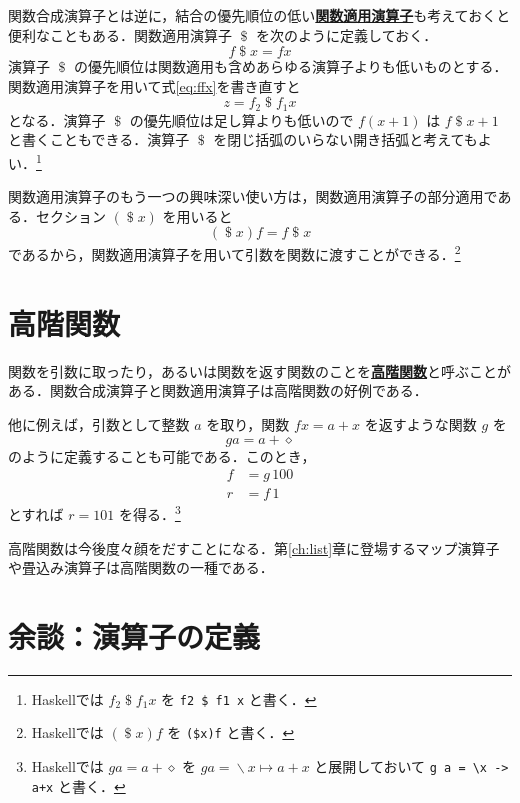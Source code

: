 \documentclass[a5paper,twoside,fleqn,draft]{jsbook}
\newcommand{\programminglanguage}[1]{\textsf{#1}}
\newcommand{\haskell}{\programminglanguage{Haskell}}
\newcommand{\keyword}[1]{{\underline{\textbf{#1}}}}
\newcommand{\code}[1]{\texttt{#1}}
\newcommand{\mAnonParam}{\diamond}
\DeclareMathOperator{\mApply}{\$}
\DeclareMathOperator{\mLambda}{\backslash}
\DeclareMathOperator{\mLambdaArrow}{\mapsto}
\newcommand{\mLambdaEXP}[2]{\mLambda{#1}\mLambdaArrow{#2}} %
\begin{document}
関数合成演算子とは逆に，結合の優先順位の低い\keyword{関数適用演算子}も考えておくと便利なこともある．関数適用演算子 $\mApply$ を次のように定義しておく．
\begin{equation}
  f\mApply x
  =fx
\end{equation}
演算子 $\mApply$ の優先順位は関数適用も含めあらゆる演算子よりも低いものとする．関数適用演算子を用いて式\eqref{eq:ffx}を書き直すと
\begin{equation}
  z
  =f_2\mApply f_1x
\end{equation}
となる．演算子 $\mApply$ の優先順位は足し算よりも低いので $f(x+1)$ は $f\mApply x+1$ と書くこともできる．演算子 $\mApply$ を閉じ括弧のいらない開き括弧と考えてもよい．\footnote{\haskell では $f_2\mApply f_1x$ を \code{f2 \$ f1 x} と書く．}

関数適用演算子のもう一つの興味深い使い方は，関数適用演算子の部分適用である．セクション $(\mApply x)$ を用いると
\begin{equation}
  (\mApply x)f
  =f\mApply x
\end{equation}
であるから，関数適用演算子を用いて引数を関数に渡すことができる．\footnote{\haskell では $(\mApply x)f$ を \code{(\$x)f} と書く．}

\section{高階関数}

関数を引数に取ったり，あるいは関数を返す関数のことを\keyword{高階関数}と呼ぶことがある．関数合成演算子と関数適用演算子は高階関数の好例である．

他に例えば，引数として整数 $a$ を取り，関数 $fx=a+x$ を返すような関数 $g$ を
\begin{equation}
  ga
  =a+\mAnonParam
\end{equation}
のように定義することも可能である．このとき，
\begin{align}
  f
  &=g\,100\\
  r
  &=f\,1
\end{align}
とすれば $r=101$ を得る．\footnote{\haskell では $ga=a+\mAnonParam$ を $ga=\mLambdaEXP{x}{a+x}$ と展開しておいて \code{g a = \textbackslash x -> a+x} と書く．}

高階関数は今後度々顔をだすことになる．第\ref{ch:list}章に登場するマップ演算子や畳込み演算子は高階関数の一種である．

\section{余談：演算子の定義}
\end{document}
